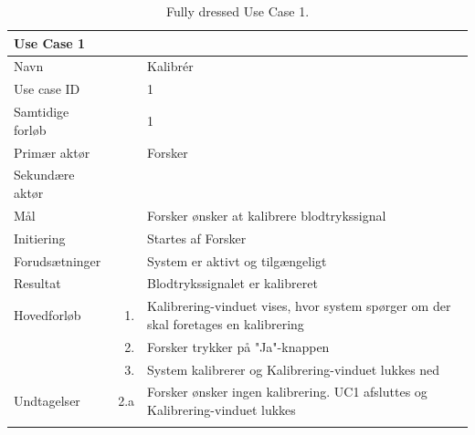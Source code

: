 \begin{longtabu} to  %
    {\large \textbf{Use Case 1}} && \\
    \toprule
    Navn &&    Kalibrér\\
    Use case ID &&    1\\
    Samtidige forløb &&    1\\
    Primær aktør &&    Forsker\\
    Sekundære aktør &&	 \\
    Mål &&    Forsker ønsker at kalibrere blodtrykssignal\\
    Initiering &&	Startes af Forsker\\
    Forudsætninger &&  System er aktivt og tilgængeligt\\
    Resultat &&		Blodtrykssignalet er kalibreret                         \\ \midrule
    Hovedforløb &    1. &	 Kalibrering-vinduet vises, hvor system spørger om der skal foretages en kalibrering\\[-1ex]  				
    			&    2. &    Forsker trykker på "Ja"\--knappen\\
                &    3.	&	 System kalibrerer og Kalibrering-vinduet lukkes ned \newline\\ \midrule
                
    Undtagelser &    2.a &   Forsker ønsker ingen kalibrering. UC1 afsluttes og Kalibrering-vinduet lukkes  \\ \bottomrule
\caption{Fully dressed Use Case 1.}
\label{UC1}
\end{longtabu}


